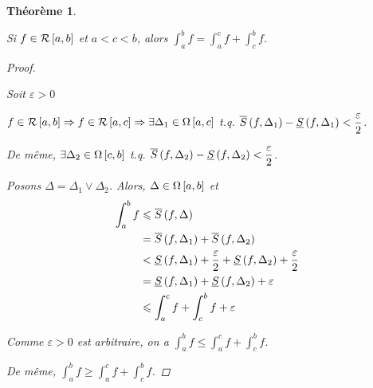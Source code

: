 \documentclass{report}
\newcommand*{\dint}[3]{\displaystyle\int_{#1}^{#2}#3}
\newcommand*{\raffinement}[2]{#1 \vee #2}
\newcommand*{\eps}{\varepsilon}
\newcommand*{\lte}{\leqslant}
\newcommand*{\gte}{\geqslant}
\newtheorem*{thm}{Th\'eor\`eme}
\theoremstyle{definition}
\theoremstyle{remark}
\begin{document}
	\begin{thm}
		~

		Si $f \in \riemann$ et $a<c<b$, alors $\dint{a}{b}{f} = \dint{a}{c}{f} + \dint{c}{b}{f}$.
		\begin{proof}~

			Soit $\eps>0$

			$f \in \riemann \Rightarrow f \in \riemann[a,c] \Rightarrow \exists\Delta_1 \in \partitions[a,c]$ t.q. $\ssup{f}[\Delta_1] - \sinf{f}[\Delta_1] < \dfrac{\eps}{2}$.

			De m\^eme, $\exists\Delta_2 \in \partitions[c,b]$ t.q. $\ssup{f}[\Delta_2] - \sinf{f}[\Delta_2] < \dfrac{\eps}{2}$.

			Posons $\Delta = \raffinement{\Delta_1}{\Delta_2}$. Alors, $\Delta \in \partitions$ et
			\begin{align*}
				\dint{a}{b}{f}&\lte \ssup{f}\\
				&= \ssup{f}[\Delta_1] + \ssup{f}[\Delta_2]\\
				&< \sinf{f}[\Delta_1] + \dfrac{\eps}{2} + \sinf{f}[\Delta_2] + \dfrac{\eps}{2}\\
				&= \sinf{f}[\Delta_1] + \sinf{f}[\Delta_2] + \eps\\
				&\lte \dint{a}{c}{f} + \dint{c}{b}{f} + \eps
			\end{align*}

			Comme $\eps>0$ est arbitraire, on a $\dint{a}{b}{f} \lte \dint{a}{c}{f} + \dint{c}{b}{f}$.

			De m\^eme, $\dint{a}{b}{f} \gte \dint{a}{c}{f} + \dint{c}{b}{f}$.
		\end{proof}
	\end{thm}
\end{document}

